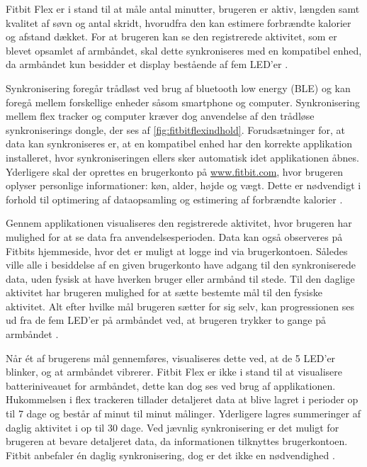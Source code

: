 \noindent
Fitbit Flex er i stand til at måle antal minutter, brugeren er aktiv, længden samt kvalitet af søvn og antal skridt, hvorudfra den kan estimere forbrændte kalorier og afstand dækket. 
For at brugeren kan se den registrerede aktivitet, som er blevet opsamlet af armbåndet, skal dette synkroniseres med en kompatibel enhed, da armbåndet kun besidder et display bestående af fem LED'er \citep{fitbitflex}. 

Synkronisering foregår trådløst ved brug af bluetooth low energy (BLE) og kan foregå mellem forskellige enheder såsom smartphone og computer. 
Synkronisering mellem flex tracker og computer kræver dog anvendelse af den trådløse synkroniserings dongle, der ses af \autoref{fig:fitbitflexindhold}.
Forudsætninger for, at data kan synkroniseres er, at en kompatibel enhed har den korrekte applikation installeret, hvor synkroniseringen ellers sker automatisk idet applikationen åbnes.  
Yderligere skal der oprettes en brugerkonto på \url{www.fitbit.com}, hvor brugeren oplyser personlige informationer: køn, alder, højde og vægt. Dette er nødvendigt i forhold til optimering af dataopsamling og estimering af forbrændte kalorier \citep{fitbitflex}.  

Gennem applikationen visualiseres den registrerede aktivitet, hvor brugeren har mulighed for at se data fra anvendelsesperioden. Data kan også observeres på Fitbits hjemmeside, hvor det er muligt at logge ind via brugerkontoen. 
Således ville alle i besiddelse af en given brugerkonto have adgang til den synkroniserede data, uden fysisk at have hverken bruger eller armbånd til stede. 
Til den daglige aktivitet har brugeren mulighed for at sætte bestemte mål til den fysiske aktivitet. Alt efter hvilke mål brugeren sætter for sig selv, kan progressionen ses ud fra de fem LED'er på armbåndet ved, at brugeren trykker to gange på armbåndet \citep{fitbitflex}.   

Når ét af brugerens mål gennemføres, visualiseres dette ved, at de 5 LED'er blinker, og at armbåndet vibrerer. 
Fitbit Flex er ikke i stand til at visualisere batteriniveauet for armbåndet, dette kan dog ses ved brug af applikationen. 
Hukommelsen i flex trackeren tillader detaljeret data at blive lagret i perioder op til 7 dage og består af minut til minut målinger.  
Yderligere lagres summeringer af daglig aktivitet i op til 30 dage. 
Ved jævnlig synkronisering er det muligt for brugeren at bevare detaljeret data, da informationen tilknyttes brugerkontoen. 
Fitbit anbefaler én daglig synkronisering, dog er det ikke en nødvendighed \citep{fitbitflex}. 

